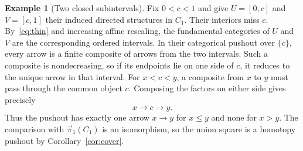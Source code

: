 \documentclass[12pt,a4paper]{amsart}
\theoremstyle{definition}
\newtheorem{example}[theorem]{Example}
\renewcommand{\leq}{\leqslant}
\renewcommand{\vec}{\overrightarrow}
\newcommand{\cube}[1]{C_{#1}}
\newcommand{\PiC}{\vec{\pi}_1}
\begin{document}
\begin{example}[Two closed subintervals]\label{ex:closed-halves}
Fix $0<c<1$ and give $U=[0,c]$ and $V=[c,1]$ their induced directed structures in $\cube1$. Their interiors miss $c$. By~\eqref{eq:thin} and increasing affine rescaling, the fundamental categories of $U$ and $V$ are the corresponding ordered intervals. In their categorical pushout over $\{c\}$, every arrow is a finite composite of arrows from the two intervals. Such a composite is nondecreasing, so if its endpoints lie on one side of $c$, it reduces to the unique arrow in that interval. For $x<c<y$, a composite from $x$ to $y$ must pass through the common object $c$. Composing the factors on either side gives precisely
\[
 x\longrightarrow c\longrightarrow y .
\]
Thus the pushout has exactly one arrow $x\to y$ for $x\leq y$ and none for $x>y$. The comparison with $\PiC(\cube1)$ is an isomorphism, so the union square is a homotopy pushout by Corollary~\ref{cor:cover}.
\end{example}
\end{document}
